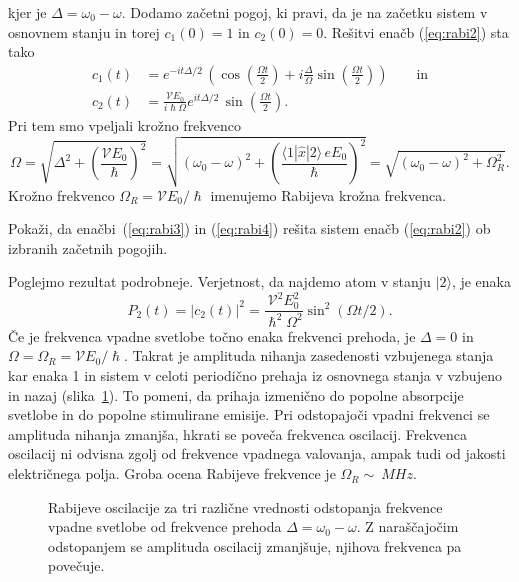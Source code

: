 kjer je $\Delta = \omega_0-\omega$. Dodamo začetni pogoj, ki pravi, da je na začetku
sistem v osnovnem stanju in torej $c_1(0)=1$ in $c_2(0)=0$. Rešitvi enačb
(\ref{eq:rabi2}) sta tako
\begin{align}
c_1(t)&=e^{-it\Delta/2}\, \left(\cos\left(\frac{\Omega t}{2}\right) + 
i \frac{\Delta}{\Omega} \sin\left(\frac{\Omega t}{2}\right) \right)\qquad \mathrm{in} 
\label{eq:rabi3} \\
c_2(t)&=\frac{\mathcal{V}E_0}{i\hslash \Omega} e^{it\Delta/2}\, \sin\left(\frac{\Omega t}{2}\right).
\label{eq:rabi4}
\end{align}
Pri tem smo vpeljali krožno frekvenco
\begin{equation}
\Omega = \sqrt{\Delta^2 + \left(\frac{\mathcal{V}E_0}{\hslash}\right)^2} = \sqrt{(\omega_0-\omega)^2 
+ \left(\frac{\langle1|\hat{x}|2\rangle\, eE_0}{\hslash}\right)^2} = 
\sqrt{(\omega_0-\omega)^2 + \Omega_R^2}.
\end{equation}
Krožno frekvenco $\Omega_R = \mathcal{V} E_0/\hslash$ imenujemo Rabijeva krožna frekvenca.

\begin{naloga}
Pokaži, da enačbi~(\ref{eq:rabi3}) in (\ref{eq:rabi4}) rešita
sistem enačb (\ref{eq:rabi2}) ob izbranih začetnih pogojih.
\end{naloga}
Poglejmo rezultat podrobneje. Verjetnost, da najdemo atom v stanju $|2\rangle$, je enaka
\begin{equation}
P_2(t) = |c_2(t)|^2 = \frac{\mathcal{V}^2E_0^2}{\hslash^2 \Omega^2}\sin^2(\Omega t/2).
\end{equation}
Če je frekvenca vpadne svetlobe točno enaka frekvenci prehoda, je $\Delta = 0$ in 
$\Omega = \Omega_R = \mathcal{V}E_0/\hslash$. Takrat je amplituda nihanja zasedenosti vzbujenega stanja kar enaka 1
in sistem v celoti periodično prehaja iz osnovnega stanja v vzbujeno in nazaj (slika~\ref{fig:Rabi}). To pomeni,
da prihaja izmenično do popolne absorpcije svetlobe in do popolne stimulirane emisije.
Pri odstopajoči vpadni frekvenci se amplituda nihanja zmanjša, hkrati se poveča
frekvenca oscilacij. Frekvenca oscilacij ni odvisna zgolj od frekvence vpadnega valovanja, 
ampak tudi od jakosti električnega polja. Groba ocena
Rabijeve frekvence je $\Omega_R \sim~\si{MHz}$.
\begin{figure}[h]
\centering
\def\svgwidth{100truemm} 

\caption{Rabijeve oscilacije za tri različne vrednosti odstopanja frekvence vpadne
svetlobe od frekvence prehoda $\Delta=\omega_0-\omega$. 
Z naraščajočim odstopanjem se amplituda oscilacij
zmanjšuje, njihova frekvenca pa povečuje.}
\label{fig:Rabi}
\end{figure}

